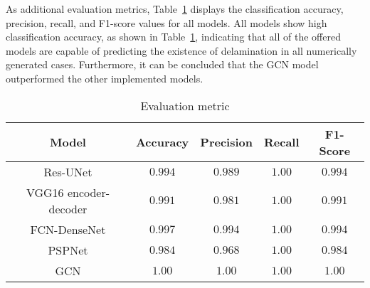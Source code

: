 As additional evaluation metrics, Table~\ref{tab:evaluation_metric} displays the classification accuracy, precision, recall, and F1-score values for all models.
All models show high classification accuracy, as shown in Table~\ref{tab:evaluation_metric}, indicating that all of the offered models are capable of predicting the existence of delamination in all numerically generated cases.
Furthermore, it can be concluded that the GCN model outperformed the other implemented models.
\begin{table}[]
	\centering
	\caption{Evaluation metric}
	\label{tab:evaluation_metric}
	\resizebox{\textwidth}{!}
	{
		\begin{tabular}{ccccc} \hline
			Model& Accuracy & Precision & Recall & F1-Score \\ \hline
			Res-UNet & \(0.994\) & \(0.989\) & \(1.00\) & \(0.994\) \\ 
			VGG16 encoder-decoder & \(0.991\) & \(0.981\) & \(1.00\) & \(0.991\)\\ 
			FCN-DenseNet & \(0.997\) & \(0.994\) & \(1.00\) & \(0.994\) \\ 
			PSPNet & \(0.984\) & \(0.968\) & \(1.00\) & \(0.984\) \\ 
			GCN & \(1.00\) & \(1.00\) & \(1.00\) & \(1.00\) \\ \hline
		\end{tabular}
	}
\end{table}
